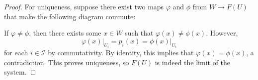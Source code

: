 \documentclass{article}
\newcommand{\fI}{\mathscr{I}}
\begin{document}
\begin{proof}
   For uniqueness, suppose there exist two maps $\varphi$ and $\phi$ from $W\to F(U)$ that make the following diagram commute:
   \begin{center}
   \end{center}
   If $\varphi \ne \phi$, then there exists some $x\in W$ such that $\varphi(x)\ne \phi(x)$. However,
   \[
   \varphi(x)\vert_{U_i} =p_i(x)=\phi(x)\vert_{U_i}
   \]
   for each $i\in \fI$ by commutativity. By identity, this implies that $\varphi(x)=\phi(x)$, a contradiction. This proves uniqueness, so $F(U)$ is indeed the limit of the system.
   

\end{proof}
\end{document}
